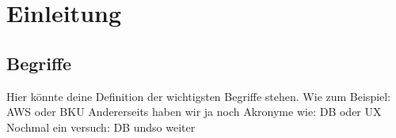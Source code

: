\chapter{Einleitung}

\section{Begriffe}

Hier könnte deine Definition der wichtigsten Begriffe stehen. 
Wie zum Beispiel: \gls{AWS} oder \gls{BKU}
Andererseits haben wir ja noch Akronyme wie: 
\gls{DB} oder \gls{UX}
Nochmal ein versuch: \gls{DB} undso weiter